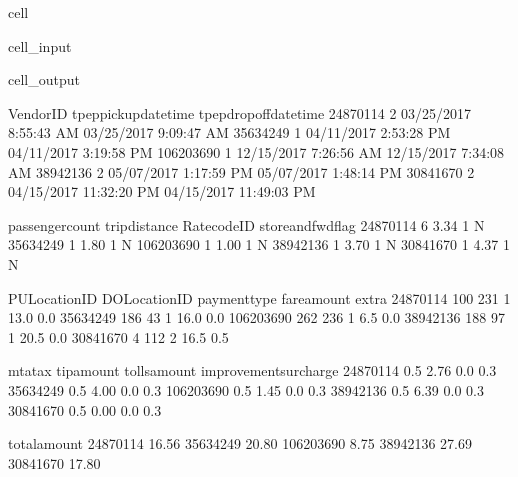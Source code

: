 \documentclass[letterpaper,10pt,english]{sphinxmanual}
\begin{document}
\begin{sphinxuseclass}{cell}
\begin{sphinxuseclass}{cell_input}
\begin{sphinxVerbatim}[commandchars=\\\{\}]
\end{sphinxVerbatim}

\end{sphinxuseclass}
\begin{sphinxuseclass}{cell_output}
\begin{sphinxVerbatim}[commandchars=\\\{\}]
           VendorID    tpep\PYGZus{}pickup\PYGZus{}datetime   tpep\PYGZus{}dropoff\PYGZus{}datetime  \PYGZbs{}
24870114          2   03/25/2017 8:55:43 AM   03/25/2017 9:09:47 AM   
35634249          1   04/11/2017 2:53:28 PM   04/11/2017 3:19:58 PM   
106203690         1   12/15/2017 7:26:56 AM   12/15/2017 7:34:08 AM   
38942136          2   05/07/2017 1:17:59 PM   05/07/2017 1:48:14 PM   
30841670          2  04/15/2017 11:32:20 PM  04/15/2017 11:49:03 PM   

           passenger\PYGZus{}count  trip\PYGZus{}distance  RatecodeID store\PYGZus{}and\PYGZus{}fwd\PYGZus{}flag  \PYGZbs{}
24870114                 6           3.34           1                  N   
35634249                 1           1.80           1                  N   
106203690                1           1.00           1                  N   
38942136                 1           3.70           1                  N   
30841670                 1           4.37           1                  N   

           PULocationID  DOLocationID  payment\PYGZus{}type  fare\PYGZus{}amount  extra  \PYGZbs{}
24870114            100           231             1         13.0    0.0   
35634249            186            43             1         16.0    0.0   
106203690           262           236             1          6.5    0.0   
38942136            188            97             1         20.5    0.0   
30841670              4           112             2         16.5    0.5   

           mta\PYGZus{}tax  tip\PYGZus{}amount  tolls\PYGZus{}amount  improvement\PYGZus{}surcharge  \PYGZbs{}
24870114       0.5        2.76           0.0                    0.3   
35634249       0.5        4.00           0.0                    0.3   
106203690      0.5        1.45           0.0                    0.3   
38942136       0.5        6.39           0.0                    0.3   
30841670       0.5        0.00           0.0                    0.3   

           total\PYGZus{}amount  
24870114          16.56  
35634249          20.80  
106203690          8.75  
38942136          27.69  
30841670          17.80  
\end{sphinxVerbatim}

\end{sphinxuseclass}
\end{sphinxuseclass}
\end{document}
